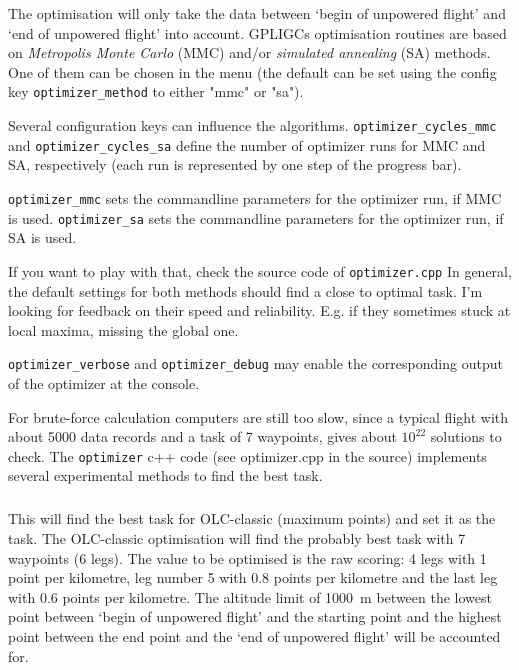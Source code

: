 The optimisation will only take the data between `begin of unpowered flight' and `end of unpowered flight' into account.
GPLIGCs optimisation routines are based on \emph{Metropolis Monte Carlo} (MMC) and/or \emph{simulated annealing} (SA) methods.
One of them can be chosen in the menu (the default can be set using the config key \texttt{optimizer\_method} to either "mmc" or "sa").

Several configuration keys can influence the algorithms.
\texttt{optimizer\_cycles\_mmc} and \texttt{optimizer\_cycles\_sa} define the number of optimizer runs for MMC and SA, respectively (each run is represented by one step of the progress bar).

\texttt{optimizer\_mmc} sets the commandline parameters for the optimizer run, if MMC is used.
\texttt{optimizer\_sa} sets the commandline parameters for the optimizer run, if SA is used.

If you want to play with that, check the source code of \texttt{optimizer.cpp}
In general, the default settings for both methods should find a close to optimal task.
I'm looking for feedback on their speed and reliability.
E.g. if they sometimes stuck at local maxima, missing the global one.

\texttt{optimizer\_verbose} and \texttt{optimizer\_debug} may enable the corresponding output of the optimizer at the console.

For brute-force calculation computers are still too slow, since a typical flight with about 5000 data records and a task of 7 waypoints, gives about $10^{22}$ solutions to check. The \texttt{optimizer} c++ code (see optimizer.cpp in the source) implements several experimental methods to find the best task.



\subparagraph{
}
This will find the best task for OLC-classic (maximum points) and set it  as  the task.
The OLC-classic optimisation will find the probably best task with 7 waypoints (6 legs). The value to be optimised is the raw scoring: 4 legs with 1 point per kilometre, leg number 5 with 0.8 points per kilometre and the last leg with 0.6 points per kilometre. The altitude limit of 1000~m between the lowest point between `begin of unpowered flight' and the starting point and the highest point between the end point and the `end of unpowered flight' will be accounted  for.

\subparagraph{
}


